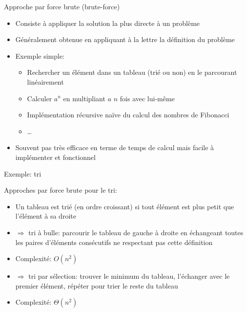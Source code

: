 \begin{frame}{Approche par force brute (brute-force)}
\begin{itemize}
\item Consiste à appliquer la solution la plus directe à un problème
\item Généralement obtenue en appliquant à la lettre la définition du problème
\item Exemple simple:
\begin{itemize}
\item Rechercher un élément dans un tableau (trié ou non) en le parcourant linéairement
\item Calculer $a^n$ en multipliant $a$ $n$ fois avec lui-même
\item Implémentation récursive naïve du calcul des nombres de Fibonacci
\item \ldots
\end{itemize}
\item Souvent pas très efficace en terme de temps de calcul mais facile à implémenter et fonctionnel
\end{itemize}

\end{frame}

\begin{frame}{Exemple: tri}

Approches par force brute pour le tri:
\begin{itemize}
\item Un tableau est trié (en ordre croissant) si tout élément est plus petit que l'élément à sa droite
\item $\Rightarrow$ tri à bulle: parcourir le tableau de gauche à droite en échangeant toutes les paires d'éléments consécutifs ne respectant pas cette définition
\item Complexité: $O(n^2)$
\item $\Rightarrow$ tri par sélection: trouver le minimum du tableau, l'échanger avec le premier élément, répéter pour trier le reste du tableau
\item Complexité: $\Theta(n^2)$
\end{itemize}
\end{frame}

